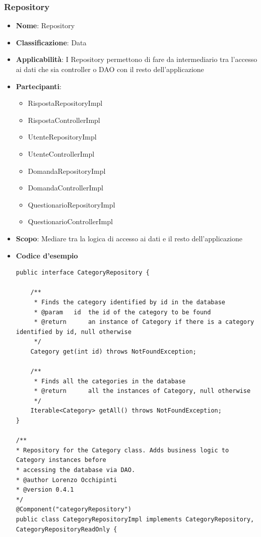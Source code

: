 \documentclass[12pt]{article}
\begin{document}
		\subsubsection{Repository}
		\begin{itemize}
		\item \textbf{Nome}: Repository
            \item \textbf{Classificazione}: Data
            \item \textbf{Applicabilità}: I Repository permettono di fare da intermediario tra l'accesso ai dati che sia controller o DAO con il resto dell'applicazione
            \item \textbf{Partecipanti}:
                \begin{itemize}
                    \item RispostaRepositoryImpl
                    \item RispostaControllerImpl
                    \item UtenteRepositoryImpl
                    \item UtenteControllerImpl
                    \item DomandaRepositoryImpl
                    \item DomandaControllerImpl
                    \item QuestionarioRepositoryImpl
                    \item QuestionarioControllerImpl
                \end{itemize}
            \item \textbf{Scopo}: Mediare tra la logica di accesso ai dati e il resto dell'applicazione
            \item \textbf{Codice d'esempio}
            \begin{lstlisting}
public interface CategoryRepository {

	/**
	 * Finds the category identified by id in the database
	 * @param   id  the id of the category to be found
	 * @return      an instance of Category if there is a category identified by id, null otherwise
	 */
	Category get(int id) throws NotFoundException;
	
	/**
	 * Finds all the categories in the database
	 * @return      all the instances of Category, null otherwise
	 */
	Iterable<Category> getAll() throws NotFoundException;
}

/**
* Repository for the Category class. Adds business logic to Category instances before
* accessing the database via DAO.
* @author Lorenzo Occhipinti
* @version 0.4.1
*/
@Component("categoryRepository")
public class CategoryRepositoryImpl implements CategoryRepository, CategoryRepositoryReadOnly {
	

\end{lstlisting}
\end{itemize}
\end{document}
